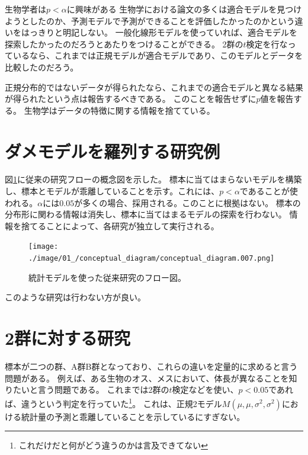 \begin{SMbox}{生物学者は$p<\alpha$に興味がある}
 生物学における論文の多くは適合モデルを見つけようとしたのか、予測モデルで予測ができることを評価したかったのかという違いをはっきりと明記しない。
 一般化線形モデルを使っていれば、適合モデルを探索したかったのだろうとあたりをつけることができる。
 2群の$t$検定を行なっているなら、これまでは正規モデルが適合モデルであり、このモデルとデータを比較したのだろう。

 正規分布的ではないデータが得られたなら、これまでの適合モデルと異なる結果が得られたという点は報告するべきである。
 このことを報告せずに$p$値を報告する。
 生物学はデータの特徴に関する情報を捨てている。
\end{SMbox}


\section{ダメモデルを羅列する研究例}

図\ref{fig:conceptual_diagram_statistics_research_current}に従来の研究フローの概念図を示した。
標本に当てはまらないモデルを構築し、標本とモデルが乖離していることを示す。これには、$p<\alpha$であることが使われる。$\alpha$には$0.05$が多くの場合、採用される。このことに根拠はない。
標本の分布形に関わる情報は消失し、標本に当てはまるモデルの探索を行わない。
情報を捨てることによって、各研究が独立して実行される。

\begin{figure}
 \begin{center}
  \texttt{[image: ./image/01\_/conceptual\_diagram/conceptual\_diagram.007.png]}
  \caption{統計モデルを使った従来研究のフロー図。}
  \label{fig:conceptual_diagram_statistics_research_current}
 \end{center}
\end{figure}

このような研究は行わない方が良い。


\section{2群に対する研究}
標本が二つの群、A群B群となっており、これらの違いを定量的に求めると言う問題がある。
例えば、ある生物のオス、メスにおいて、体長が異なることを知りたいと言う問題である。
これまでは2群の$t$検定などを使い、$p<0.05$であれば、違うという判定を行っていた\footnote{これだけだと何がどう違うのかは言及できてない}。
これは、正規2モデル$M(\mu,\mu,\sigma^2,\sigma^2)$における統計量の予測と乖離していることを示しているにすぎない。

